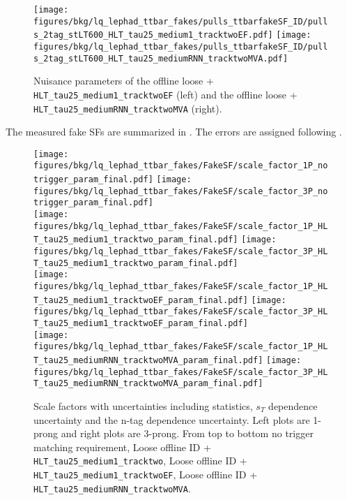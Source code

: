 \begin{figure}
    \centering
    \texttt{[image: figures/bkg/lq\_lephad\_ttbar\_fakes/pulls\_ttbarfakeSF\_ID/pulls\_2tag\_stLT600\_HLT\_tau25\_medium1\_tracktwoEF.pdf]}
    \texttt{[image: figures/bkg/lq\_lephad\_ttbar\_fakes/pulls\_ttbarfakeSF\_ID/pulls\_2tag\_stLT600\_HLT\_tau25\_mediumRNN\_tracktwoMVA.pdf]}
  \caption{Nuisance parameters of the offline loose + \texttt{HLT\_tau25\_medium1\_tracktwoEF} (left) and
           the offline loose + \texttt{HLT\_tau25\_mediumRNN\_tracktwoMVA} (right).}
  \label{fig:lq_ttbarfake_nps2}
\end{figure}

The measured fake \tauhad SFs are summarized in . The errors are assigned following .

\begin{figure}
    \centering
    \texttt{[image: figures/bkg/lq\_lephad\_ttbar\_fakes/FakeSF/scale\_factor\_1P\_notrigger\_param\_final.pdf]}
    \texttt{[image: figures/bkg/lq\_lephad\_ttbar\_fakes/FakeSF/scale\_factor\_3P\_notrigger\_param\_final.pdf]} \\
    \texttt{[image: figures/bkg/lq\_lephad\_ttbar\_fakes/FakeSF/scale\_factor\_1P\_HLT\_tau25\_medium1\_tracktwo\_param\_final.pdf]}
    \texttt{[image: figures/bkg/lq\_lephad\_ttbar\_fakes/FakeSF/scale\_factor\_3P\_HLT\_tau25\_medium1\_tracktwo\_param\_final.pdf]} \\
    \texttt{[image: figures/bkg/lq\_lephad\_ttbar\_fakes/FakeSF/scale\_factor\_1P\_HLT\_tau25\_medium1\_tracktwoEF\_param\_final.pdf]}
    \texttt{[image: figures/bkg/lq\_lephad\_ttbar\_fakes/FakeSF/scale\_factor\_3P\_HLT\_tau25\_medium1\_tracktwoEF\_param\_final.pdf]} \\
    \texttt{[image: figures/bkg/lq\_lephad\_ttbar\_fakes/FakeSF/scale\_factor\_1P\_HLT\_tau25\_mediumRNN\_tracktwoMVA\_param\_final.pdf]}
    \texttt{[image: figures/bkg/lq\_lephad\_ttbar\_fakes/FakeSF/scale\_factor\_3P\_HLT\_tau25\_mediumRNN\_tracktwoMVA\_param\_final.pdf]} \\
  \caption{Scale factors with uncertainties including statistics, $s_T$ dependence uncertainty and the n-tag dependence uncertainty.
  Left plots are 1-prong and right plots are 3-prong. From top to bottom no trigger matching requirement, Loose offline \tauhad ID + \texttt{HLT\_tau25\_medium1\_tracktwo},
  Loose offline \tauhad ID + \texttt{HLT\_tau25\_medium1\_tracktwoEF}, Loose offline \tauhad ID + \texttt{HLT\_tau25\_mediumRNN\_tracktwoMVA}.}
  \label{fig:lq_ttbarfake_scale_factors}
\end{figure}

